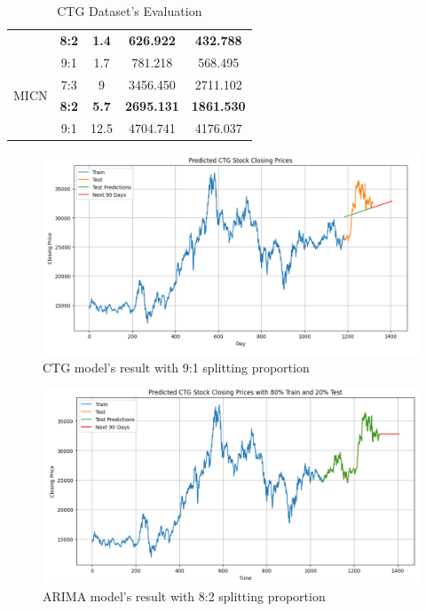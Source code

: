 \documentclass{ieeeojies}
\begin{document}
\begin{table}[H]
\begin{tabular}{|c|c|c|c|c|}
         & \textbf{8:2} & \textbf{1.4} & \textbf{626.922} & \textbf{432.788} \\ 
         & 9:1 & 1.7 & 781.218 & 568.495 \\
         \hline
         \multirow{2}{*}{MICN} & 7:3 & 9 & 3456.450 & 2711.102 \\ 
         & \textbf{8:2} & \textbf{5.7} & \textbf{2695.131} & \textbf{1861.530} \\ 
         & 9:1 & 12.5 & 4704.741 & 4176.037 \\
         \hline
    \end{tabular}
    \caption{CTG Dataset's Evaluation}
    \label{ctgresult}
\end{table}


\begin{figure}[H]
  \centering
  \begin{minipage}{0.8\linewidth}
    \centering
    \includegraphics[width=\linewidth]{bibliography/CTG-LN-9-1.png}
    \caption{CTG model's result with 9:1 splitting proportion}
    \label{fig22}
  \end{minipage}
\end{figure}
\begin{figure}[H]
  \centering
  \begin{minipage}{0.8\linewidth}
    \centering
    \includegraphics[width=\linewidth]{bibliography/CTG-ARIMA-8-2.png}
    \caption{ARIMA model's result with 8:2 splitting proportion}
    \label{fig23}
  \end{minipage}
\end{figure}
\end{document}

